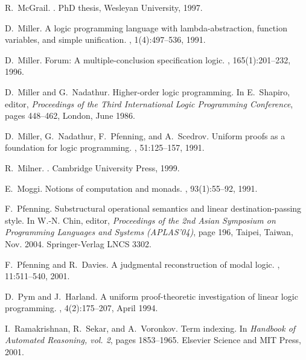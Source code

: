 \documentclass{sig-alt}
\begin{document}
\begin{thebibliography}{50}
R.~McGrail.
.
\newblock PhD thesis, Wesleyan University, 1997.

D.~Miller.
\newblock A logic programming language with lambda-abstraction, function
  variables, and simple unification.
, 1(4):497--536, 1991.

D.~Miller.
\newblock Forum: {A} multiple-conclusion specification logic.
, 165(1):201--232, 1996.

D.~Miller and G.~Nadathur.
\newblock Higher-order logic programming.
\newblock In E.~Shapiro, editor, {\em Proceedings of the Third International
  Logic Programming Conference}, pages 448--462, London, June 1986.

D.~Miller, G.~Nadathur, F.~Pfenning, and A.~Scedrov.
\newblock Uniform proofs as a foundation for logic programming.
, 51:125--157, 1991.

R.~Milner.
.
\newblock Cambridge University Press, 1999.

E.~Moggi.
\newblock Notions of computation and monads.
, 93(1):55--92, 1991.

F.~Pfenning.
\newblock Substructural operational semantics and linear destination-passing
  style.
\newblock In W.-N. Chin, editor, {\em Proceedings of the 2nd Asian Symposium on
  Programming Languages and Systems (APLAS'04)}, page 196, Taipei, Taiwan, Nov.
  2004. Springer-Verlag LNCS 3302.

F.~Pfenning and R.~Davies.
\newblock A judgmental reconstruction of modal logic.
, 11:511--540, 2001.

D.~Pym and J.~Harland.
\newblock A uniform proof-theoretic investigation of linear logic programming.
, 4(2):175--207, April 1994.

I.~Ramakrishnan, R.~Sekar, and A.~Voronkov.
\newblock Term indexing.
\newblock In {\em Handbook of Automated Reasoning, vol. 2}, pages 1853--1965.
  Elsevier Science and MIT Press, 2001.


\end{thebibliography}
\end{document}
